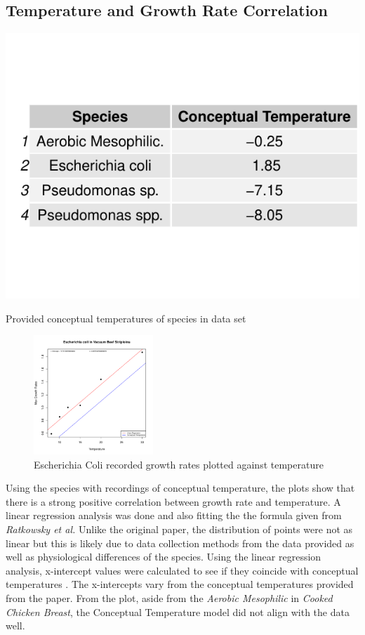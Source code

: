 \documentclass[11pt]{article}
\begin{document}
\subsection{Temperature and Growth Rate Correlation}
\begin{table}[h!]
\centering
\includegraphics[scale=0.60]{../Results/Species_ConceptualTemp.pdf} \caption{Provided conceptual temperatures of species in data set} \label{tab:Conceptual Temperature}
\end{table}
\begin{figure}
    \begin{center}
        \includegraphics[width=0.40\textwidth]{../Results/Ecoli_r_temp.pdf}
    \end{center}
    \caption{Escherichia Coli recorded growth rates plotted against temperature}
    \label{fig:E.coli correlation}
\end{figure}
Using the species with recordings of conceptual temperature, the plots show that there is a strong positive correlation between growth rate and temperature. A linear regression analysis was done and also fitting the the formula given from \textit{Ratkowsky et al.} Unlike the original paper, the distribution of points were not as linear but this is likely due to data collection methods from the data provided as well as physiological differences of the species. Using the linear regression analysis, x-intercept values were calculated to see if they coincide with conceptual temperatures \cite{ratkowsky1982relationship}. The x-intercepts vary from the conceptual temperatures provided from the paper. From the plot, aside from the \textit{Aerobic Mesophilic} in \textit{Cooked Chicken Breast}, the Conceptual Temperature model did not align with the data well.
\end{document}
